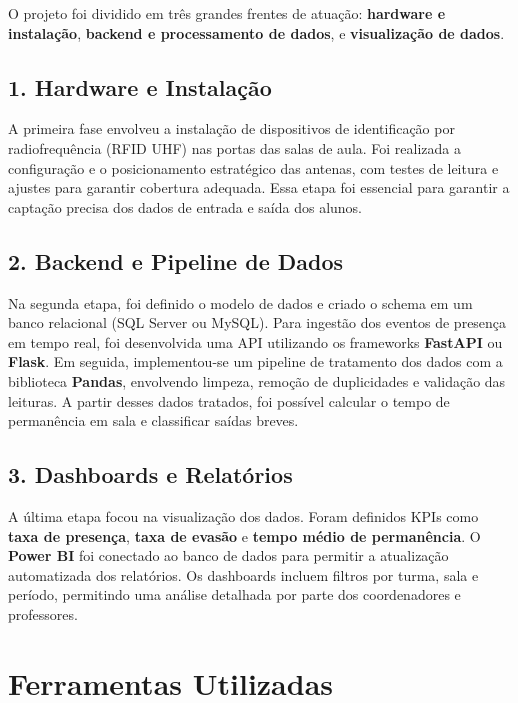 \documentclass[
  letterpaper,
]{article}
\begin{document}
O projeto foi dividido em três grandes frentes de atuação:
\textbf{hardware e instalação}, \textbf{backend e processamento de
dados}, e \textbf{visualização de dados}.

\subsection{1. Hardware e Instalação}\label{hardware-e-instalauxe7uxe3o}

A primeira fase envolveu a instalação de dispositivos de identificação
por radiofrequência (RFID UHF) nas portas das salas de aula. Foi
realizada a configuração e o posicionamento estratégico das antenas, com
testes de leitura e ajustes para garantir cobertura adequada. Essa etapa
foi essencial para garantir a captação precisa dos dados de entrada e
saída dos alunos.

\subsection{2. Backend e Pipeline de
Dados}\label{backend-e-pipeline-de-dados}

Na segunda etapa, foi definido o modelo de dados e criado o schema em um
banco relacional (SQL Server ou MySQL). Para ingestão dos eventos de
presença em tempo real, foi desenvolvida uma API utilizando os
frameworks \textbf{FastAPI} ou \textbf{Flask}. Em seguida,
implementou-se um pipeline de tratamento dos dados com a biblioteca
\textbf{Pandas}, envolvendo limpeza, remoção de duplicidades e validação
das leituras. A partir desses dados tratados, foi possível calcular o
tempo de permanência em sala e classificar saídas breves.

\subsection{3. Dashboards e
Relatórios}\label{dashboards-e-relatuxf3rios}

A última etapa focou na visualização dos dados. Foram definidos KPIs
como \textbf{taxa de presença}, \textbf{taxa de evasão} e \textbf{tempo
médio de permanência}. O \textbf{Power BI} foi conectado ao banco de
dados para permitir a atualização automatizada dos relatórios. Os
dashboards incluem filtros por turma, sala e período, permitindo uma
análise detalhada por parte dos coordenadores e professores.

\section{Ferramentas Utilizadas}\label{ferramentas-utilizadas}
\end{document}
